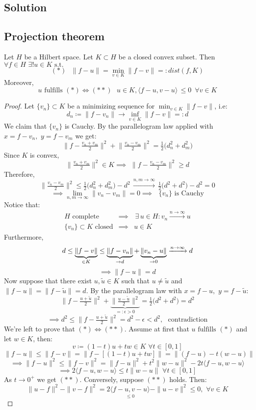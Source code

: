 \subsection*{Solution}

\subsection{Projection theorem}
Let $H$ be a Hilbert space. Let $K \subset H$ be a closed convex subset. Then $\forall f\in H\,\, \exists ! u\in K\mbox{ s.t. } $
\[ (*)\,\,\,\,\|f-u\|= \displaystyle\min_{v\in K}\|f-v\| =: dist(f,K) \]
Moreover, \[ u \mbox{ fulfills } (*) \iff (**)\,\,\,\, u\in K, \langle  f-u,v-u\rangle\,\le 0\,\,\,\forall v \in K \]

\begin{proof}
Let $\{v_n\} \subset K$ be a minimizing sequence for $\displaystyle\min_{v\in K}\|f-v\|$, i.e:
\[ d_n \coloneqq\|f-v_n\| \to \displaystyle \inf_{v\in K} \|f-v\| =: d \]
We claim that $\{v_n\}$ is Cauchy. \newline 
By the parallelogram law applied with $x= f-v_n,\,\, y=f-v_m$ we get:
\[ \big\|f-\tfrac{v_n+v_m}{2}\big\|^2+\big\|\tfrac{v_n-v_m}{2}\big\|^2 = \tfrac{1}{2}\big(d_n^2+d_m^2\big) \]
Since $K$ is convex, 
\[ \|\tfrac{v_n+v_m}{2}\|^2 \in K \implies\,\, \|f-\tfrac{v_n-v_m}{2}\|^2 \ge d \]
Therefore,
\[ \|\tfrac{v_n-v_m}{2}\|^2\le \tfrac{1}{2}\big(d_n^2+d_m^2\big)-d^2 \,\xrightarrow{n,m\to \infty}\, \tfrac{1}{2}\big(d^2+d^2\big)-d^2 = 0 \]
\[ \implies\displaystyle\lim_{n,m \to \infty} \|v_n-v_m\| = 0\implies \mbox{ $\{v_n\}$ is Cauchy} \]
Notice that:
\[
    \begin{array}{rcl}
        H \mbox{ complete} & \implies&\,\exists\, u\in H: v_n \xrightarrow{n\to \infty} u \\
        \{v_n\}\subset  K \mbox{ closed} & \implies& u \in K
    \end{array}
\]
Furthermore,
\[ d \le \underbrace{\|f-v\|}_{\in K} \le \underbrace{\|f-v_n\|}_{\to d} + \underbrace{\|v_n-u\|}_{\to 0} \xrightarrow{n\to\infty} d \]
\[ \implies \|f-u\|=d \]
Now suppose that there exist $u,\tilde{u}\in K$ such that $u\neq\tilde{u}$ and $\|f-u\|=\|f-\tilde{u}\|=d$.
\newline
By the parallelogram law with $x=f-u,\,\, y=f-\tilde{u}$:
\[ \big\|f-\tfrac{u+\tilde{u}}{2}\big\|^2+\underbrace{\big\|\tfrac{u-\tilde{u}}{2}\big\|^2}_{=:\epsilon>0} = \tfrac{1}{2}\big(d^2+d^2\big)=d^2 \]
\[ \implies d^2 \le \big\|f-\tfrac{u+\tilde{u}}{2}\big\|^2 = d^2 - \epsilon < d^2,\,\,\,\,\mbox{contradiction} \]\newline
We're left to prove that $(*) \iff (**)$.
Assume at first that $u \mbox{ fulfills } (*)$ and let $w \in K$, then:
\[ v \coloneqq (1-t)u +tw \in K\,\,\forall t\in [0,1] \]
\[ \|f-u\| \le \|f-v\| = \|f-[(1-t)u +tw]\| = \|(f-u)-t(w-u)\| \]
\[ \implies \|f-u\|^2  \le \|f-v\|^2 = \|f-u\|^2+t^2\|w-u\|^2-2t\langle f-u,w-u\rangle \]
\[ \implies 2\langle f-u,w-u\rangle  \le t\|w-u\|\,\,\forall t \in [0,1] \] 
As $t \to 0^+$ we get $(**)$.\newline
Conversely, suppose $(**)$ holds. Then:
\[ \|u-f\|^2-\|v-f\|^2=2\underset{\le 0}{\langle f-u,v-u\rangle }-\|u-v\|^2\le 0 ,\,\,\forall v\in K \]
\end{proof}

